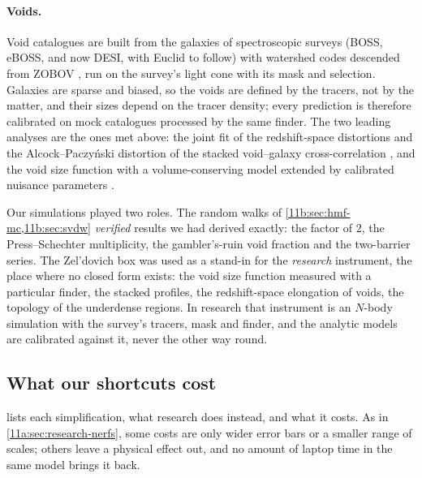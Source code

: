 \paragraph{Voids.}
Void catalogues are built from the galaxies of spectroscopic surveys (BOSS,
eBOSS, and now DESI, with Euclid to follow) with watershed codes descended from
ZOBOV \cite{Neyrinck2008}, run on the survey's light cone with its mask and
selection. Galaxies are sparse and biased, so the voids are defined by the
tracers, not by the matter, and their sizes depend on the tracer density; every
prediction is therefore calibrated on mock catalogues processed by the same
finder. The two leading analyses are the ones met above: the joint fit of the
redshift-space distortions and the Alcock--Paczy\'nski distortion of the stacked
void--galaxy cross-correlation \cite{Hamaus2020}, and the void size function with
a volume-conserving model extended by calibrated nuisance parameters
\cite{Contarini2023}.

\begin{inpractice}
Our simulations played two roles. The random walks of
\cref{11b:sec:hmf-mc,11b:sec:svdw} \emph{verified} results we had derived
exactly: the factor of $2$, the Press--Schechter multiplicity, the gambler's-ruin
void fraction and the two-barrier series. The Zel'dovich box was used as a
stand-in for the \emph{research} instrument, the place where no closed form exists:
the void size function measured with a particular finder, the stacked profiles, the
redshift-space elongation of voids, the topology of the underdense regions. In
research that instrument is an $N$-body simulation with the survey's tracers,
mask and finder, and the analytic models are calibrated against it, never the other
way round.
\end{inpractice}

\subsection{What our shortcuts cost}
\label{11b:sec:research-nerfs}

 lists each simplification, what research does instead, and
what it costs. As in \cref{11a:sec:research-nerfs}, some costs are only wider
error bars or a smaller range of scales; others leave a physical effect out, and
no amount of laptop time in the same model brings it back.

